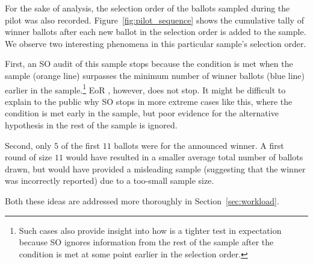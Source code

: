 For the sake of analysis, the selection order of the ballots sampled during the pilot was also recorded. Figure~\ref{fig:pilot_sequence} shows the cumulative tally of winner ballots after each new ballot in the selection order is added to the sample. We observe two interesting phenomena in this particular sample's selection order. 
\begin{description}
\item First, an SO \BRAVO audit of this sample stops because the \BRAVO condition is met when the sample (orange line) surpasses the minimum number of winner ballots (blue line) earlier in the sample.\footnote{Such cases also provide insight into how \Providence is a tighter test in expectation because SO \BRAVO ignores information from the rest of the sample after the \BRAVO condition is met at some point earlier in the selection order.} EoR \BRAVO, however, does not stop. It might be difficult to explain to the public why SO \BRAVO stops in more extreme cases like this, where the condition is met early in the sample, but poor evidence for the alternative hypothesis in the rest of the sample is ignored. 
\item Second, only $5$ of the first $11$ ballots were for the announced winner. A first round of size $11$ would have resulted in a smaller average total number of ballots drawn, but would have provided a misleading sample (suggesting that the winner was incorrectly reported) due to a too-small sample size. 
\end{description}
Both these ideas are addressed more thoroughly in Section~\ref{sec:workload}.

